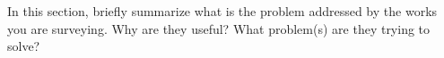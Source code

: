 In this section, briefly summarize what is the problem addressed by the works you are surveying. Why are they useful? What problem(s) are they trying to solve? 
